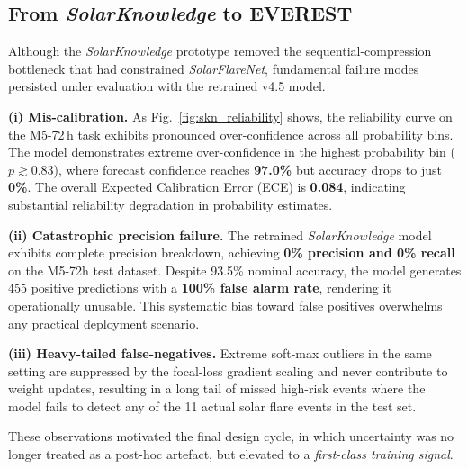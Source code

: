 \subsection{From \textit{SolarKnowledge} to \textsc{EVEREST}}
\label{sec:sk2ev-transition}
Although the \textit{SolarKnowledge} prototype removed the sequential-compression
bottleneck that had constrained \textit{SolarFlareNet}, fundamental failure modes
persisted under evaluation with the retrained v4.5 model.

\textbf{(i) Mis-calibration.}
As Fig.~\ref{fig:skn_reliability} shows, the reliability curve on the M5-72\,h
task exhibits pronounced over-confidence across all probability bins. The model
demonstrates extreme over-confidence in the highest probability bin ($p \gtrsim 0.83$),
where forecast confidence reaches \textbf{97.0\%} but accuracy drops to just \textbf{0\%}.
The overall Expected Calibration Error (ECE) is \textbf{0.084}, indicating
substantial reliability degradation in probability estimates.

\textbf{(ii) Catastrophic precision failure.}
The retrained \textit{SolarKnowledge} model exhibits complete precision breakdown,
achieving \textbf{0\% precision and 0\% recall} on the M5-72h test dataset.
Despite 93.5\% nominal accuracy, the model generates 455 positive predictions
with a \textbf{100\% false alarm rate}, rendering it operationally unusable.
This systematic bias toward false positives overwhelms any practical deployment
scenario.

\textbf{(iii) Heavy-tailed false-negatives.}
Extreme soft-max outliers in the same setting are suppressed by the focal-loss
gradient scaling and never contribute to weight updates, resulting in a long tail
of missed high-risk events where the model fails to detect any of the 11 actual
solar flare events in the test set.

These observations motivated the final design cycle, in which uncertainty was no
longer treated as a post-hoc artefact, but elevated to a \emph{first-class training signal}.

